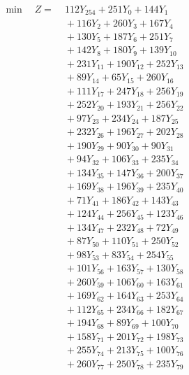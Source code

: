 \documentclass[a4paper,10pt]{article}
\begin{document}
\allowdisplaybreaks
{\small
\begin{align}
\min \quad Z = &\; 112 Y_{254} + 251 Y_{0} + 144 Y_{1} \\[0.3ex]
&\;  + 116 Y_{2} + 260 Y_{3} + 167 Y_{4} \\[0.3ex]
&\;  + 130 Y_{5} + 187 Y_{6} + 251 Y_{7} \\[0.3ex]
&\;  + 142 Y_{8} + 180 Y_{9} + 139 Y_{10} \\[0.3ex]
&\;  + 231 Y_{11} + 190 Y_{12} + 252 Y_{13} \\[0.3ex]
&\;  + 89 Y_{14} + 65 Y_{15} + 260 Y_{16} \\[0.3ex]
&\;  + 111 Y_{17} + 247 Y_{18} + 256 Y_{19} \\[0.3ex]
&\;  + 252 Y_{20} + 193 Y_{21} + 256 Y_{22} \\[0.3ex]
&\;  + 97 Y_{23} + 234 Y_{24} + 187 Y_{25} \\[0.3ex]
&\;  + 232 Y_{26} + 196 Y_{27} + 202 Y_{28} \\[0.5ex]\allowbreak
&\;  + 190 Y_{29} + 90 Y_{30} + 90 Y_{31} \\[0.3ex]
&\;  + 94 Y_{32} + 106 Y_{33} + 235 Y_{34} \\[0.3ex]
&\;  + 134 Y_{35} + 147 Y_{36} + 200 Y_{37} \\[0.3ex]
&\;  + 169 Y_{38} + 196 Y_{39} + 235 Y_{40} \\[0.3ex]
&\;  + 71 Y_{41} + 186 Y_{42} + 143 Y_{43} \\[0.3ex]
&\;  + 124 Y_{44} + 256 Y_{45} + 123 Y_{46} \\[0.3ex]
&\;  + 134 Y_{47} + 232 Y_{48} + 72 Y_{49} \\[0.3ex]
&\;  + 87 Y_{50} + 110 Y_{51} + 250 Y_{52} \\[0.3ex]
&\;  + 98 Y_{53} + 83 Y_{54} + 254 Y_{55} \\[0.3ex]
&\;  + 101 Y_{56} + 163 Y_{57} + 130 Y_{58} \\[0.5ex]\allowbreak
&\;  + 260 Y_{59} + 106 Y_{60} + 163 Y_{61} \\[0.3ex]
&\;  + 169 Y_{62} + 164 Y_{63} + 253 Y_{64} \\[0.3ex]
&\;  + 112 Y_{65} + 234 Y_{66} + 182 Y_{67} \\[0.3ex]
&\;  + 194 Y_{68} + 89 Y_{69} + 100 Y_{70} \\[0.3ex]
&\;  + 158 Y_{71} + 201 Y_{72} + 198 Y_{73} \\[0.3ex]
&\;  + 255 Y_{74} + 213 Y_{75} + 100 Y_{76} \\[0.3ex]
&\;  + 260 Y_{77} + 250 Y_{78} + 235 Y_{79} \\[0.3ex]

\end{align}}
\end{document}
